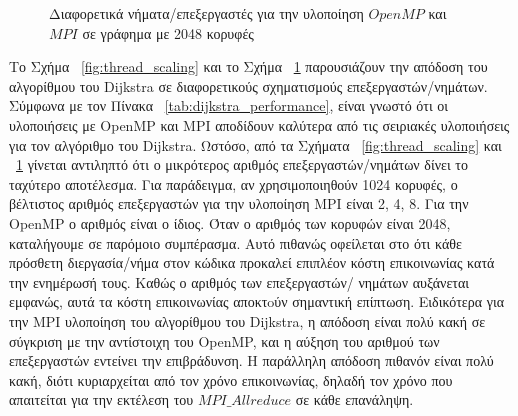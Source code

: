 \documentclass[12pt,a4paper]{article} %
\begin{document}
{\vspace{0.3cm}


\begin{figure}[H]
\centering
{}
\caption{Διαφορετικά νήματα/επεξεργαστές για την υλοποίηση $OpenMP$ και $MPI$ σε γράφημα με 2048 κορυφές}
\label{fig:thread_scaling2}
\end{figure}


Το Σχήμα ~\ref{fig:thread_scaling} και το Σχήμα ~\ref{fig:thread_scaling2} παρουσιάζουν την απόδοση του αλγορίθμου του Dijkstra σε διαφορετικούς σχηματισμούς επεξεργαστών/νημάτων. Σύμφωνα με τον Πίνακα ~\ref{tab:dijkstra_performance}, είναι γνωστό ότι οι υλοποιήσεις με OpenMP και MPI αποδίδουν καλύτερα από τις σειριακές υλοποιήσεις για τον αλγόριθμο του Dijkstra. Ωστόσο, από τα Σχήματα ~\ref{fig:thread_scaling} και ~\ref{fig:thread_scaling2} γίνεται αντιληπτό ότι ο μικρότερος αριθμός επεξεργαστών/νημάτων δίνει το ταχύτερο αποτέλεσμα. Για παράδειγμα, αν χρησιμοποιηθούν 1024 κορυφές, ο βέλτιστος αριθμός επεξεργαστών για την υλοποίηση MPI είναι 2, 4, 8. Για την  OpenMP ο αριθμός είναι ο ίδιος. Όταν ο αριθμός των κορυφών είναι 2048, καταλήγουμε σε παρόμοιο συμπέρασμα. Αυτό πιθανώς οφείλεται στο ότι κάθε πρόσθετη διεργασία/νήμα στον κώδικα προκαλεί επιπλέον κόστη επικοινωνίας κατά την ενημέρωσή τους. Καθώς ο αριθμός των επεξεργαστών/ νημάτων αυξάνεται εμφανώς, αυτά τα κόστη επικοινωνίας αποκτoύν σημαντική επίπτωση. Ειδικότερα για την MPI υλοποίηση του αλγορίθμου του Dijkstra, η απόδοση είναι πολύ κακή σε σύγκριση με την αντίστοιχη του OpenMP, και η αύξηση του αριθμού των επεξεργαστών εντείνει την επιβράδυνση. Η παράλληλη απόδοση πιθανόν είναι πολύ κακή, διότι κυριαρχείται από τον χρόνο επικοινωνίας, δηλαδή τον χρόνο που απαιτείται για την εκτέλεση του $MPI\_Allreduce$ σε κάθε επανάληψη.

}
\end{document}
